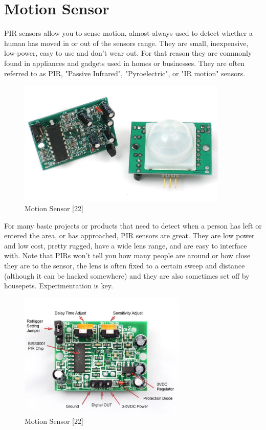 \documentclass[twoside,a4paper,16pt]{book}
\begin{document}
{{			\section{Motion Sensor }
			PIR sensors allow you to sense motion, almost always used to detect whether a human has moved in or out of the sensors range. They are small, inexpensive, low-power, easy to use and don't wear out. For that reason they are commonly found in appliances and gadgets used in homes or businesses. They are often referred to as PIR, "Passive Infrared", "Pyroelectric", or "IR motion" sensors.
			\begin{figure}[ht!]
				\begin{center}
					\includegraphics[width=10.0cm]{13.jpg}
					\caption{Motion Sensor [22]}
				\end{center}
			\end{figure}
			For many basic projects or products that need to detect when a person has left or entered the area, or has approached, PIR sensors are great. They are low power and low cost, pretty rugged, have a wide lens range, and are easy to interface with. Note that PIRs won't tell you how many people are around or how close they are to the sensor, the lens is often fixed to a certain sweep and distance (although it can be hacked somewhere) and they are also sometimes set off by housepets. Experimentation is key.
			\begin{figure}[ht!]
				\begin{center}
					\includegraphics[width=8.0cm]{14.jpg}
					\caption{Motion Sensor [22]}
				\end{center}
			\end{figure}
}}
\end{document}
